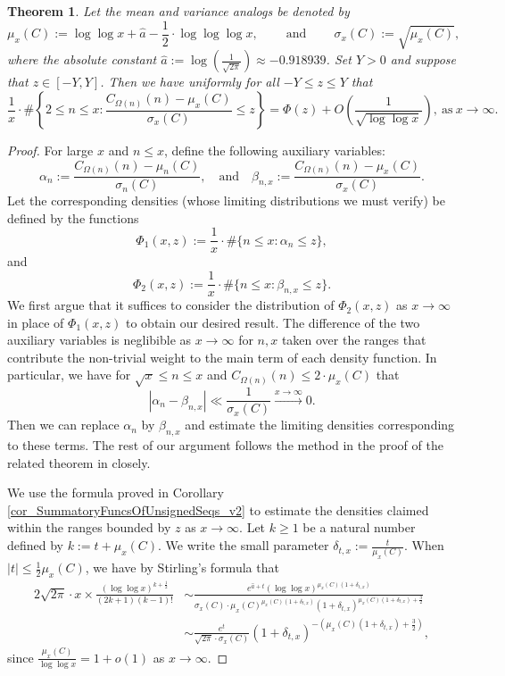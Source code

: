 \documentclass[11pt,reqno,a4letter]{article}
\numberwithin{figure}{section}
\numberwithin{table}{section}
\theoremstyle{plain}
\newtheorem{theorem}{Theorem}
\numberwithin{theorem}{section}
\theoremstyle{definition}
\begin{document}
\begin{theorem} 
\label{theorem_CLT_VI} 
Let the mean and variance analogs be denoted by 
\[
\mu_x(C) := \log\log x + \hat{a} - \frac{1}{2} \cdot \log\log\log x, 
     \qquad \mathrm{\ and\ } \qquad 
     \sigma_x(C) := \sqrt{\mu_x(C)}, 
\]
where the absolute constant 
$\hat{a} := \log\left(\frac{1}{\sqrt{2\pi}}\right) \approx -0.918939$. 
Set $Y > 0$ and suppose that $z \in [-Y, Y]$. Then we have 
uniformly for all $-Y \leq z \leq Y$ that 
\[
\frac{1}{x} \cdot \#\left\{2 \leq n \leq x: 
     \frac{C_{\Omega(n)}(n) - \mu_x(C)}{\sigma_x(C)} \leq z\right\} = 
     \Phi(z) + O\left(\frac{1}{\sqrt{\log\log x}}\right), 
     \mathrm{\ as\ } x \rightarrow \infty. 
\] 
\end{theorem} 
\begin{proof} 
For large $x$ and $n \leq x$, define the following auxiliary variables: 
\[
\alpha_n := \frac{C_{\Omega(n)}(n) - \mu_n(C)}{\sigma_n(C)}, \quad\mathrm{and}\quad 
     \beta_{n,x} := \frac{C_{\Omega(n)}(n) - \mu_x(C)}{\sigma_x(C)}. 
\] 
Let the corresponding densities (whose limiting distributions we must verify) 
be defined by the functions 
\[
\Phi_1(x, z) := \frac{1}{x} \cdot \#\{n \leq x: \alpha_n \leq z\}, 
\]
and 
\[
\Phi_2(x, z) := \frac{1}{x} \cdot \#\{n \leq x: \beta_{n,x} \leq z\}. 
\] 
We first argue that it suffices to consider the distribution of $\Phi_2(x, z)$ as 
$x \rightarrow \infty$ in place of $\Phi_1(x, z)$ to obtain our desired result. 
The difference of the two auxiliary variables is neglibible as 
$x \rightarrow \infty$ for $n,x$ taken over the ranges that contribute the non-trivial 
weight to the main term of each density function. In particular, we have for 
$\sqrt{x} \leq n \leq x$ and $C_{\Omega(n)}(n) \leq 2 \cdot \mu_x(C)$ that 
\[
|\alpha_n - \beta_{n,x}| \ll \frac{1}{\sigma_x(C)} \xrightarrow{x \rightarrow \infty} 0. 
\]
Then we can replace $\alpha_n$ by $\beta_{n,x}$ and estimate the limiting 
densities corresponding to these terms. 
The rest of our argument follows the method in the proof of the related theorem in 
\cite[Thm.\ 7.21; \S 7.4]{MV} closely. 

We use the formula proved in Corollary \ref{cor_SummatoryFuncsOfUnsignedSeqs_v2} 
to estimate the densities claimed within the ranges bounded by 
$z$ as $x \rightarrow \infty$. 
Let $k \geq 1$ be a natural number defined by $k := t + \mu_x(C)$. 
We write the small parameter $\delta_{t,x} := \frac{t}{\mu_x(C)}$. 
When $|t| \leq \frac{1}{2} \mu_x(C)$, we have by Stirling's formula that 
\begin{align*} 
2\sqrt{2\pi} \cdot x \times 
     \frac{(\log\log x)^{k+\frac{1}{2}}}{(2k+1)(k-1)!} & \sim 
     \frac{e^{\hat{a} + t} 
     (\log\log x)^{\mu_x(C)(1+\delta_{t,x})}}{ 
     \sigma_x(C) \cdot \mu_x(C)^{\mu_x(C) (1 + \delta_{t,x})}
     (1 + \delta_{t,x})^{\mu_x(C) (1 + \delta_{t,x}) + \frac{3}{2}}} \\ 
     & \sim \frac{e^{t}}{\sqrt{2\pi} \cdot \sigma_x(C)} (1 + \delta_{t,x})^{-\left( 
     \mu_x(C) (1 + \delta_{t,x}) + \frac{3}{2}\right)}, 
\end{align*} 
since $\frac{\mu_x(C)}{\log\log x} = 1 + o(1)$ as $x \rightarrow \infty$. 


\end{proof}
\end{document}
